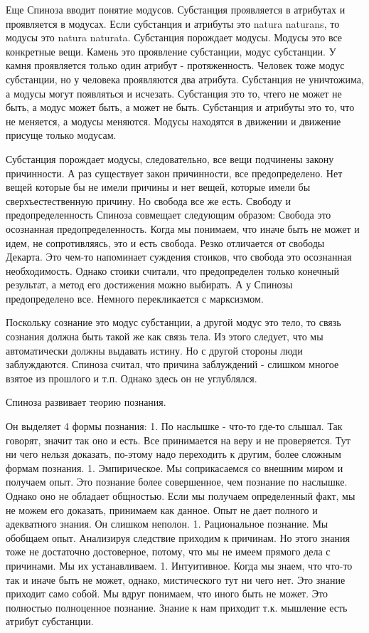 Еще Спиноза вводит понятие модусов. Субстанция проявляется в атрибутах и проявляется в модусах. Если субстанция и атрибуты это natura naturans, то модусы это natura naturata. Субстанция порождает модусы. Модусы это все конкретные вещи. Камень это проявление субстанции, модус субстанции. У камня проявляется только один атрибут - протяженность. Человек тоже модус субстанции, но у человека проявляются два атрибута. Субстанция не уничтожима, а модусы могут появляться и исчезать. Субстанция это то, чтего не может не быть, а модус может быть, а может не быть. Субстанция и атрибуты это то, что не меняется, а модусы меняются. Модусы находятся в движении и движение присуще только модусам.

Субстанция порождает модусы, следовательно, все вещи подчинены закону причинности. А раз существует закон причинности, все предопределено. Нет вещей которые бы не имели причины и нет вещей, которые имели бы сверхъестественную причину. Но свобода все же есть. Свободу и предопределенность Спиноза совмещает следующим образом: Свобода это осознанная предопределенность. Когда мы понимаем, что иначе быть не может и идем, не сопротивляясь, это и есть свобода. Резко отличается от свободы Декарта. Это чем-то напоминает суждения стоиков, что свобода это осознанная необходимость. Однако стоики считали, что предопределен только конечный результат, а метод его достижения можно выбирать. А у Спинозы предопределено все. Немного перекликается с марксизмом.

Поскольку сознание это модус субстанции, а другой модус это тело, то связь сознания должна быть такой же как связь тела. Из этого следует, что мы автоматически должны выдавать истину. Но с другой стороны люди заблуждаются. Спиноза считал, что причина заблуждений - слишком многое взятое из прошлого и т.п. Однако здесь он не углублялся.

Спиноза развивает теорию познания.

    Он выделяет 4 формы познания: 1. По наслышке - что-то где-то слышал. Так говорят, значит так оно и есть. Все принимается на веру и не проверяется. Тут ни чего нельзя доказать, по-этому надо переходить к другим, более сложным формам познания. 1. Эмпирическое. Мы соприкасаемся со внешним миром и получаем опыт. Это познание более совершенное, чем познание по наслышке. Однако оно не обладает общностью. Если мы получаем определенный факт, мы не можем его доказать, принимаем как данное. Опыт не дает полного и адекватного знания. Он слишком неполон. 1. Рациональное познание. Мы обобщаем опыт. Анализируя следствие приходим к причинам. Но этого знания тоже не достаточно достоверное, потому, что мы не имеем прямого дела с причинами. Мы их устанавливаем. 1. Интуитивное. Когда мы знаем, что что-то так и иначе быть не может, однако, мистического тут ни чего нет. Это знание приходит само собой. Мы вдруг понимаем, что иного быть не может. Это полностью полноценное познание. Знание к нам приходит т.к. мышление есть атрибут субстанции.

